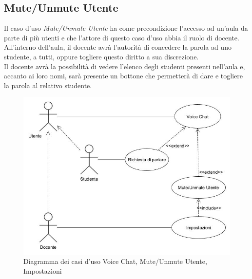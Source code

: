 \subsection{Mute/Unmute Utente}
Il caso d'uso \textit{Mute/Unmute Utente} ha come precondizione l'accesso ad un'aula da parte di più utenti e che l'attore di questo caso d'uso abbia il ruolo di docente. \\All'interno dell'aula, il docente avrà l'autorità di concedere la parola ad uno studente, a tutti, oppure togliere questo diritto a sua discrezione. \\Il docente avrà la possibilità di vedere l'elenco degli studenti presenti nell'aula e, accanto ai loro nomi, sarà presente un bottone che permetterà di dare e togliere la parola al relativo studente.
\begin{figure}[H]
    \centering
    \includegraphics[scale=0.6]{Immagini/VoiceChatUseCase.jpg}
    \caption{Diagramma dei casi d'uso Voice Chat, Mute/Unmute Utente, Impostazioni}
    \label{fig:my_label}
\end{figure}
